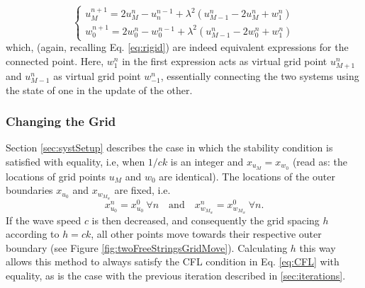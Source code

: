 \documentclass[dvipsnames, reprint]{JASA}
\def\SWcomment[#1]{\textcolor{Bittersweet}{#1}}
\begin{document}
\begin{equation}\label{eq:resultOneConnectedPoint}
    \begin{cases}
    u^{n+1}_M = 2u_M^n - u_n^{n-1} + \lambda^2(u_{M-1}^n-2u_M^n+w_1^n)\\
    w^{n+1}_0 = 2w_0^n - w_0^{n-1} + \lambda^2(u_{M-1}^n-2w_0^n+w_1^n)
    \end{cases}
\end{equation}
which, (again, recalling Eq. \eqref{eq:rigid}) are indeed equivalent expressions for the connected point. Here, $w_1^n$ in the first expression acts as virtual grid point $u_{M+1}^n$ and $u_{M-1}^n$ as virtual grid point $w_{-1}^n$, essentially connecting the two systems using the state of one in the update of the other.

\subsubsection{Changing the Grid}
Section \ref{sec:systSetup} describes the case in which the stability condition is satisfied with equality, i.e, when $1/ck$ is an integer and $x_{u_M} = x_{w_0}$ \SWcomment[(read as: the locations of grid points $u_M$ and $w_0$ are identical)]. The locations of the outer boundaries $x_{u_0}$ and $x_{w_{M_w}}$ are fixed, i.e.
\begin{equation}
    x_{u_0}^n = x_{u_0}^0\ \forall n \quad \text{and}\quad x_{w_{M_w}}^n = x_{w_{M_w}}^0\ \forall n.
\end{equation}
If the wave speed $c$ is then decreased, and consequently the grid spacing $h$ according to $h=ck$, all other points move towards their respective outer boundary (see Figure \ref{fig:twoFreeStringsGridMove}). Calculating $h$ this way allows this method to always satisfy the CFL condition in Eq. \eqref{eq:CFL} with equality, as is the case with the previous iteration described in \ref{sec:iterations}.
\end{document}
